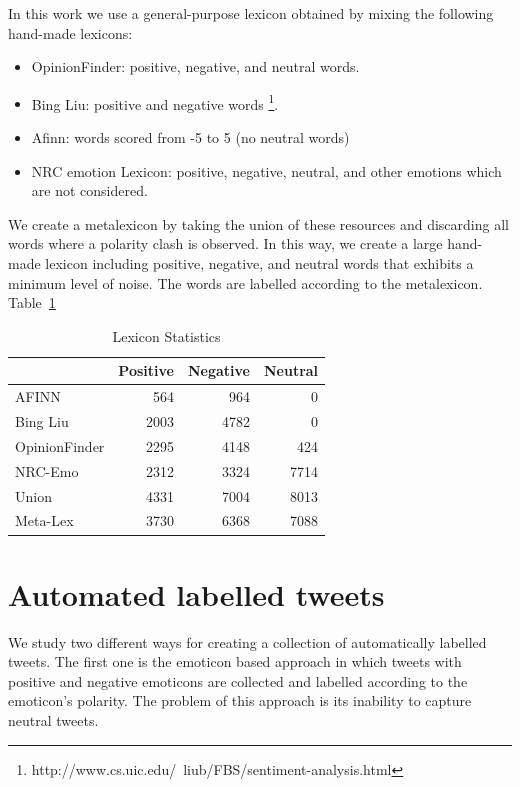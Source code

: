 \documentclass{sig-alternate}
\begin{document}
In this work we use a general-purpose lexicon obtained by mixing the following hand-made lexicons:
\begin{itemize}
\item OpinionFinder: positive, negative, and neutral words. \cite{Wilson2005}
\item Bing Liu: positive and negative words \footnote{http://www.cs.uic.edu/~liub/FBS/sentiment-analysis.html}.
\item Afinn:  \cite{Finn2011} words scored from -5 to 5 (no neutral words)
\item NRC emotion Lexicon: positive, negative, neutral, and other emotions which are not considered. \cite{Saaif2012} 
\end{itemize}

We create a metalexicon by taking the union of these resources and discarding all words where a polarity clash is observed. In this way, we create a large hand-made lexicon including positive, negative, and neutral words that exhibits a minimum level of noise. The words are labelled according to the metalexicon.  Table~\ref{tab:lexstats}


\begin{table}[htbp]
\begin{center}
\begin{tabular}{|l|r|r|r|}
\hline
 & \multicolumn{1}{l|}{Positive} & \multicolumn{1}{l|}{Negative} & \multicolumn{1}{l|}{Neutral} \\ \hline
AFINN & 564 & 964 & 0 \\ 
Bing Liu & 2003 & 4782 & 0 \\ 
OpinionFinder & 2295 & 4148 & 424 \\ 
NRC-Emo & 2312 & 3324 & 7714 \\ \hline
Union & 4331 & 7004 & 8013 \\ 
Meta-Lex & 3730 & 6368 & 7088 \\ \hline
\end{tabular}
\end{center}
\caption{Lexicon Statistics}
\label{tab:lexstats}
\end{table}




\section{Automated labelled tweets}\label{sec:tweetlab}


We study two different ways for creating a collection of automatically labelled tweets. 
The first one is the emoticon based approach in which tweets with positive and negative emoticons are collected and labelled according to the emoticon's polarity. The problem of this approach is its inability to capture neutral tweets. 
\end{document}
